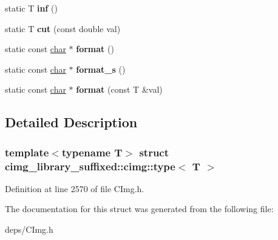 \begin{DoxyCompactItemize}
static T {\bfseries inf} ()
\item 
\mbox{\label{structcimg__library__suffixed_1_1cimg_1_1type_ab8b72e82c0f03c5494f32ccde25940f9}} 
static T {\bfseries cut} (const double val)
\item 
\mbox{\label{structcimg__library__suffixed_1_1cimg_1_1type_a8241d5ab0ee110bf68954d48cb09b616}} 
static const \hyperlink{classchar}{char} $\ast$ {\bfseries format} ()
\item 
\mbox{\label{structcimg__library__suffixed_1_1cimg_1_1type_aae8d8d625b01e033be02a1f0440405fa}} 
static const \hyperlink{classchar}{char} $\ast$ {\bfseries format\+\_\+s} ()
\item 
\mbox{\label{structcimg__library__suffixed_1_1cimg_1_1type_a282756ed38a301a26ce37292782ec5c5}} 
static const \hyperlink{classchar}{char} $\ast$ {\bfseries format} (const T \&val)
\end{DoxyCompactItemize}


\subsection{Detailed Description}
\subsubsection*{template$<$typename T$>$\newline
struct cimg\+\_\+library\+\_\+suffixed\+::cimg\+::type$<$ T $>$}



Definition at line 2570 of file C\+Img.\+h.



The documentation for this struct was generated from the following file\+:\begin{DoxyCompactItemize}
\item 
deps/C\+Img.\+h\end{DoxyCompactItemize}
